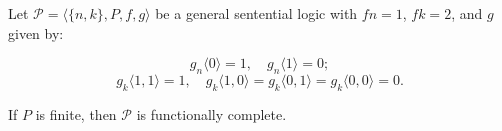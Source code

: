 Let $\mathcal{P} = \langle \{n, k\}, P, f, g \rangle$ be a general sentential logic with $fn = 1$, $fk = 2$, and $g$ given by:

$$g_n \langle 0 \rangle = 1, \quad g_n \langle 1 \rangle = 0;$$
$$g_k \langle 1, 1 \rangle = 1, \quad g_k \langle 1, 0 \rangle = g_k \langle 0, 1 \rangle = g_k \langle 0, 0 \rangle = 0.$$

If $P$ is finite, then $\mathcal{P}$ is functionally complete.
